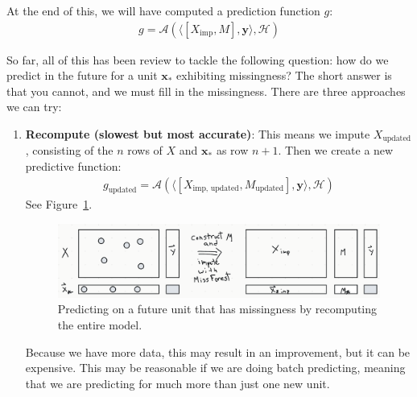 \documentclass[12pt, a4paper]{article}
\theoremstyle{definition}
\begin{document}
	At the end of this, we will have computed a prediction function $g$:
	\begin{align*}
		g = \mathcal{A}(\langle [X_{\text{imp}}, M] , \bm{y} \rangle, \mathcal{H})
	\end{align*}
	
	So far, all of this has been review to tackle the following question:
	how do we predict in the future for a unit $\bm{x}_{*}$ exhibiting
	missingness? The short answer is that you cannot, and we must fill in
	the missingness. There are three approaches we can try:
	\begin{enumerate}[label=(\textbf{\arabic*})]
		\item \textbf{Recompute (slowest but most accurate)}: This means we impute
		$X_{\text{updated}}$, consisting of the $n$ rows of $X$ and $\bm{x}_*$ as row
		$n + 1$. Then we create a new predictive function:
		\begin{align*}
			g_{\text{updated}} = \mathcal{A}(\langle [X_{\text{imp, updated}}, M_{\text{updated}}] , \bm{y} \rangle, \mathcal{H})
		\end{align*}
		See Figure~\ref{fig:predicting-future-by-recomputing}.
		\begin{figure}
			\centering
			\includegraphics[width=1.0\textwidth]{predicting-future-unit-with-missingness-recomputing}
			\caption{Predicting on a future unit that has missingness by recomputing the entire model.}
			\label{fig:predicting-future-by-recomputing}
		\end{figure}
		Because we have more data, this may result in an improvement, but it can
		be expensive. This may be reasonable if we are doing batch predicting,
		meaning that we are predicting for much more than just one new unit.
		

\end{enumerate}
\end{document}
